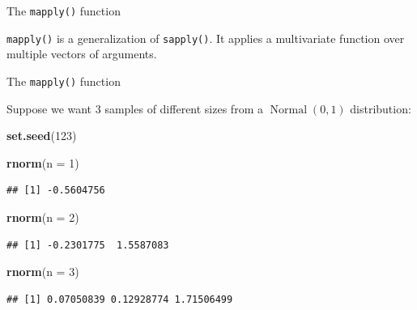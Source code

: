 \documentclass[ignorenonframetext,]{beamer}
\newenvironment{Shaded}{\begin{snugshade}}{\end{snugshade}}
\newcommand{\DataTypeTok}[1]{\textcolor[rgb]{0.13,0.29,0.53}{#1}}
\newcommand{\DecValTok}[1]{\textcolor[rgb]{0.00,0.00,0.81}{#1}}
\newcommand{\KeywordTok}[1]{\textcolor[rgb]{0.13,0.29,0.53}{\textbf{#1}}}
\newcommand{\NormalTok}[1]{#1}
\begin{document}
\begin{frame}[fragile]{The \texttt{mapply()} function}
\protect\hypertarget{the-mapply-function}{}

\texttt{mapply()} is a generalization of \texttt{sapply()}. It applies a
multivariate function over multiple vectors of arguments.

\end{frame}

\begin{frame}[fragile]{The \texttt{mapply()} function}
\protect\hypertarget{the-mapply-function-1}{}

Suppose we want 3 samples of different sizes from a
\(\operatorname{Normal}(0, 1)\) distribution:

\begin{Shaded}
\begin{Highlighting}[]
\KeywordTok{set.seed}\NormalTok{(}\DecValTok{123}\NormalTok{)}

\KeywordTok{rnorm}\NormalTok{(}\DataTypeTok{n =} \DecValTok{1}\NormalTok{)}
\end{Highlighting}
\end{Shaded}

\begin{verbatim}
## [1] -0.5604756
\end{verbatim}

\begin{Shaded}
\begin{Highlighting}[]
\KeywordTok{rnorm}\NormalTok{(}\DataTypeTok{n =} \DecValTok{2}\NormalTok{)}
\end{Highlighting}
\end{Shaded}

\begin{verbatim}
## [1] -0.2301775  1.5587083
\end{verbatim}

\begin{Shaded}
\begin{Highlighting}[]
\KeywordTok{rnorm}\NormalTok{(}\DataTypeTok{n =} \DecValTok{3}\NormalTok{)}
\end{Highlighting}
\end{Shaded}

\begin{verbatim}
## [1] 0.07050839 0.12928774 1.71506499
\end{verbatim}

\end{frame}
\end{document}
